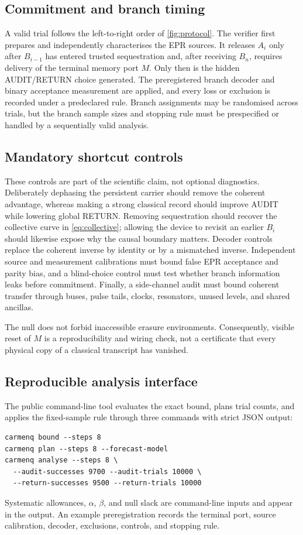 \subsection{Commitment and branch timing}

A valid trial follows the left-to-right order of \cref{fig:protocol}. The verifier first prepares and independently characterises the EPR sources. It releases $A_i$ only after $B_{i-1}$ has entered trusted sequestration and, after receiving $B_n$, requires delivery of the terminal memory port $M$. Only then is the hidden AUDIT/RETURN choice generated. The preregistered branch decoder and binary acceptance measurement are applied, and every loss or exclusion is recorded under a predeclared rule. Branch assignments may be randomised across trials, but the branch sample sizes and stopping rule must be prespecified or handled by a sequentially valid analysis.

\subsection{Mandatory shortcut controls}

These controls are part of the scientific claim, not optional diagnostics. Deliberately dephasing the persistent carrier should remove the coherent advantage, whereas making a strong classical record should improve AUDIT while lowering global RETURN. Removing sequestration should recover the collective curve in \eqref{eq:collective}; allowing the device to revisit an earlier $B_i$ should likewise expose why the causal boundary matters. Decoder controls replace the coherent inverse by identity or by a mismatched inverse. Independent source and measurement calibrations must bound false EPR acceptance and parity bias, and a blind-choice control must test whether branch information leaks before commitment. Finally, a side-channel audit must bound coherent transfer through buses, pulse tails, clocks, resonators, unused levels, and shared ancillas.

The null does not forbid inaccessible erasure environments. Consequently, visible reset of $M$ is a reproducibility and wiring check, not a certificate that every physical copy of a classical transcript has vanished.

\subsection{Reproducible analysis interface}

The public command-line tool evaluates the exact bound, plans trial counts, and applies the fixed-sample rule through three commands with strict JSON output:
\begin{small}
\begin{verbatim}
carmenq bound --steps 8
carmenq plan --steps 8 --forecast-model
carmenq analyse --steps 8 \
  --audit-successes 9700 --audit-trials 10000 \
  --return-successes 9500 --return-trials 10000
\end{verbatim}
\end{small}
Systematic allowances, $\alpha$, $\beta$, and null slack are command-line inputs and appear in the output. An example preregistration records the terminal port, source calibration, decoder, exclusions, controls, and stopping rule.

